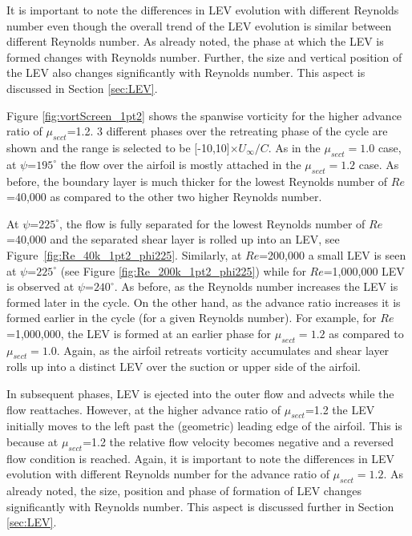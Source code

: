 It is important to note the differences in LEV evolution with different Reynolds number even though the overall trend of the LEV evolution is similar between different Reynolds number.
As already noted, the phase at which the LEV is formed changes with Reynolds number.
Further, the size and vertical position of the LEV also changes significantly with Reynolds number.
This aspect is discussed in Section \ref{sec:LEV}.

Figure \ref{fig:vortScreen_1pt2} shows the spanwise vorticity for the higher advance ratio of $\mu_{sect}$=1.2.
3 different phases over the retreating phase of the cycle are shown and the range is selected to be [-10,10]$\times U_\infty /C$.
As in the $\mu_{sect}=1.0$ case, at $\psi$=$195^\circ$ the flow over the airfoil is mostly attached in the $\mu_{sect}=1.2$ case.
As before, the boundary layer is much thicker for the lowest Reynolds number of $Re$=40,000 as compared to the other two higher Reynolds number.

At $\psi$=$225^\circ$, the flow is fully separated for the lowest Reynolds number of $Re$=40,000 and the separated shear layer is rolled up into an LEV, see Figure~\ref{fig:Re_40k_1pt2_phi225}.
Similarly, at $Re$=200,000 a small LEV is seen at $\psi$=$225^\circ$ (see Figure \ref{fig:Re_200k_1pt2_phi225}) while for $Re$=1,000,000 LEV is observed at $\psi$=$240^\circ$.
As before, as the Reynolds number increases the LEV is formed later in the cycle.
On the other hand, as the advance ratio increases it is formed earlier in the cycle (for a given Reynolds number).
For example, for $Re$=1,000,000, the LEV is formed at an earlier phase for $\mu_{sect}=1.2$ as compared to $\mu_{sect}=1.0$.
Again, as the airfoil retreats vorticity accumulates and shear layer rolls up into a distinct LEV over the suction or upper side of the airfoil.

In subsequent phases, LEV is ejected into the outer flow and advects while the flow reattaches.
However, at the higher advance ratio of $\mu_{sect}$=1.2 the LEV initially moves to the left past the (geometric) leading edge of the airfoil.
This is because at $\mu_{sect}$=1.2 the relative flow velocity becomes negative and a reversed flow condition is reached.
Again, it is important to note the differences in LEV evolution with different Reynolds number for the advance ratio of $\mu_{sect}=1.2$.
As already noted, the size, position and phase of formation of LEV changes significantly with Reynolds number.
This aspect is discussed further in Section \ref{sec:LEV}.

